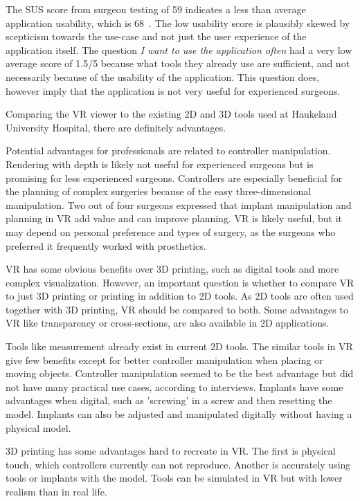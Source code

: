 \documentclass[a4paper]{report}
\begin{document}
The SUS score from surgeon testing of 59 indicates a less than average application usability, which is 68~\cite{system_usability_scale_sus_system_2013}. The low usability score is plausibly skewed by scepticism towards the use-case and not just the user experience of the application itself. The question \emph{I want to use the application often} had a very low average score of 1.5/5 because what tools they already use are sufficient, and not necessarily because of the usability of the application. This question does, however imply that the application is not very useful for experienced surgeons.

Comparing the VR viewer to the existing 2D and 3D tools used at Haukeland University Hospital, there are definitely advantages.

Potential advantages for professionals are related to controller manipulation. Rendering with depth is likely not useful for experienced surgeons but is promising for less experienced surgeons.
Controllers are especially beneficial for the planning of complex surgeries because of the easy three-dimensional manipulation.
Two out of four surgeons expressed that implant manipulation and planning in VR add value and can improve planning. VR is likely useful, but it may depend on personal preference and types of surgery, as the surgeons who preferred it frequently worked with prosthetics.



VR has some obvious benefits over 3D printing, such as digital tools and more complex visualization.
However, an important question is whether to compare VR to just 3D printing or printing in addition to 2D tools. As 2D tools are often used together with 3D printing, VR should be compared to both. Some advantages to VR like transparency or cross-sections, are also available in 2D applications.

Tools like measurement already exist in current 2D tools. The similar tools in VR give few benefits except for better controller manipulation when placing or moving objects.
Controller manipulation seemed to be the best advantage but did not have many practical use cases, according to interviews.
Implants have some advantages when digital, such as 'screwing' in a screw and then resetting the model. Implants can also be adjusted and manipulated digitally without having a physical model.

3D printing has some advantages hard to recreate in VR. The first is physical touch, which controllers currently can not reproduce. Another is accurately using tools or implants with the model. Tools can be simulated in VR but with lower realism than in real life.
\end{document}
